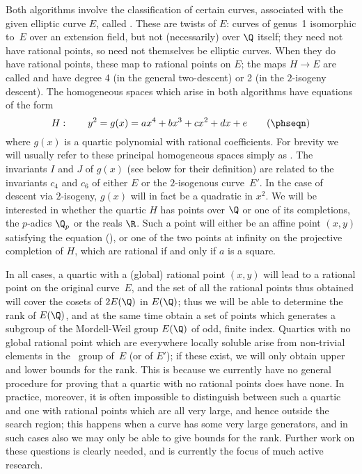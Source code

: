 Both algorithms involve the classification of certain curves,
associated with the given elliptic curve $E$, called .  These are twists of $E$: curves of
genus~1 isomorphic to~$E$ over an extension field, but not
(necessarily) over $\Q$ itself; they need not have rational points, so
need not themselves be elliptic curves.  When they do have rational
points, these map to rational points on $E$; the maps $H\to E$ are
called  and have degree 4 (in the general
two-descent) or 2 (in the $2$-isogeny descent).  The homogeneous spaces
which arise in both algorithms have equations of the form
\neweq\phseqn
$$
   H: \qquad   y^2 = g(x) = ax^4+bx^3+cx^2+dx+e \tag\phseqn 
$$
where $g(x)$ is a quartic polynomial with rational coefficients.  For
brevity we will usually refer to these principal homogeneous spaces simply as
.  The invariants $I$ and $J$ of $g(x)$ (see below for
their definition) are related to the invariants $c_4$ and $c_6$ of
either $E$ or the $2$-isogenous curve~$E'$.  In the case of descent via
$2$-isogeny, $g(x)$ will in fact be a quadratic in $x^2$.  We will be
interested in whether the quartic $H$ has points over $\Q$ or
one of its completions, the $p$-adics $\Q_p$ or the reals $\R$.  Such
a point will either be an affine point $(x,y)$ satisfying the equation
(\phseqn), or one of the two points at infinity on the projective
completion of $H$, which are rational if and only if $a$ is a square.

In all cases, a quartic with a (global) rational point $(x,y)$ will
lead to a rational point on the original curve~$E$, and the set of all
the rational points thus obtained will cover the cosets of $2E(\Q)$ in
$E(\Q)$; thus we will be able to determine the rank of $E(\Q)$, and at
the same time obtain a set of points which generates a subgroup of the
Mordell-Weil group $E(\Q)$ of odd, finite index.  Quartics with no
global rational point which are everywhere locally soluble arise from
non-trivial elements in the \TS\ group of~$E$ (or of $E'$); if these
exist, we will only obtain upper and lower bounds for the rank.  This
is because we currently have no general procedure for proving that a
quartic with no rational points does have none.  In practice,
moreover, it is often impossible to distinguish between such a quartic
and one with rational points which are all very large, and hence
outside the search region; this happens when a curve has some very
large generators, and in such cases also we may only be able to give
bounds for the rank.  Further work on these questions is clearly
needed, and is currently the focus of much active research.

